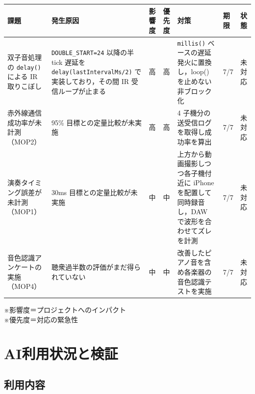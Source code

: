 \documentclass[a4paper,11pt]{ltjsarticle}
\providecommand{\％}{\%}
\begin{document}
\begingroup
\setlength{\tabcolsep}{3pt}
\sloppy
{\footnotesize
\begin{longtable}{|p{2.6cm}|p{3.2cm}|p{0.9cm}|p{0.9cm}|p{3.4cm}|p{1.3cm}|p{1.3cm}|}
\hline
\rowcolor[gray]{0.9}
課題 & 発生原因 & 影響度 & 優先度 & 対策 & 期限 & 状態 \\
\hline
双子音処理の \texttt{delay()} による IR 取りこぼし & \texttt{DOUBLE\_\-START=24} 以降の半 tick 遅延を \texttt{delay(last\-Interval\-Ms/2)} で実装しており，その間 IR 受信ループが止まる & 高 & 高 & \texttt{millis()} ベースの遅延発火に置換し，loop() を止めない非ブロック化 & 7/7 & 未対応 \\
\hline
赤外線通信成功率が未計測（MOP2） & 95\% 目標との定量比較が未実施 & 高 & 高 & 4 子機分の送受信ログを取得し成功率を算出 & 7/7 & 未対応 \\
\hline
演奏タイミング誤差が未計測（MOP1） & 30ms 目標との定量比較が未実施 & 中 & 中 & 上方から動画撮影しつつ各子機付近に iPhone を配置して同時録音し，DAW で波形を合わせてズレを計測 & 7/7 & 未対応 \\
\hline
音色認識アンケートの実施（MOP4） & 聴衆過半数の評価がまだ得られていない & 中 & 中 & 改善したピアノ音を含め各楽器の音色認識テストを実施 & 7/7 & 未対応 \\
\hline
\end{longtable}
}
\endgroup

\vspace{0.5em}
※影響度＝プロジェクトへのインパクト\\
※優先度＝対応の緊急性

\section{AI利用状況と検証}\label{sec:ai}

\subsection{利用内容}\label{sec:ai-use}
\end{document}

